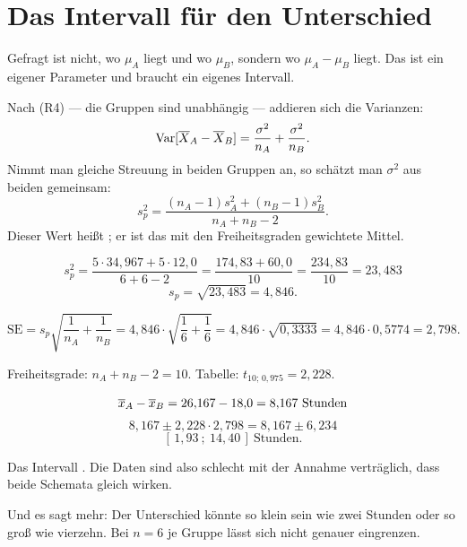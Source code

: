 \section{Das Intervall für den Unterschied}

\begin{merksatz}
Gefragt ist nicht, wo $\mu_A$ liegt und wo $\mu_B$, sondern wo $\mu_A - \mu_B$ liegt. Das ist ein eigener Parameter und braucht ein eigenes Intervall.

Nach (R4) --- die Gruppen sind unabhängig --- addieren sich die Varianzen:
\[ \operatorname{Var}[\overline X_A - \overline X_B] = \frac{\sigma^2}{n_A} + \frac{\sigma^2}{n_B} . \]
Nimmt man gleiche Streuung in beiden Gruppen an, so schätzt man $\sigma^2$ aus beiden gemeinsam:
\[ s_p^2 = \frac{(n_A-1)s_A^2 + (n_B-1)s_B^2}{n_A+n_B-2} . \]
Dieser Wert heißt ; er ist das mit den Freiheitsgraden gewichtete Mittel.
\end{merksatz}

\begin{merksatz}
\[ s_p^2 = \frac{5 \cdot 34{,}967 + 5 \cdot 12{,}0}{6+6-2} = \frac{174{,}83 + 60{,}0}{10} = \frac{234{,}83}{10} = 23{,}483 \]
\[ s_p = \sqrt{23{,}483} = 4{,}846 . \]

\[ \mathrm{SE} = s_p\sqrt{\frac{1}{n_A}+\frac{1}{n_B}} = 4{,}846 \cdot \sqrt{\frac{1}{6}+\frac{1}{6}} = 4{,}846 \cdot \sqrt{0{,}3333} = 4{,}846 \cdot 0{,}5774 = 2{,}798 . \]

Freiheitsgrade: $n_A + n_B - 2 = 10$. Tabelle: $t_{10;\,0{,}975} = 2{,}228$.

\[ \overline{x}_A - \overline{x}_B = 26{,}167 - 18{,}0 = 8{,}167 \ \text{Stunden} \]
\[ 8{,}167 \pm 2{,}228 \cdot 2{,}798 = 8{,}167 \pm 6{,}234 \]
\[ [\,1{,}93\ ;\ 14{,}40\,] \ \text{Stunden} . \]

\begin{center}
\begin{minipage}{0.9\textwidth}
Das Intervall . Die Daten sind also schlecht mit der Annahme verträglich, dass beide Schemata gleich wirken.
\end{minipage}
\end{center}

Und es sagt mehr: Der Unterschied könnte so klein sein wie zwei Stunden oder so groß wie vierzehn. Bei $n=6$ je Gruppe lässt sich nicht genauer eingrenzen.
\end{merksatz}

